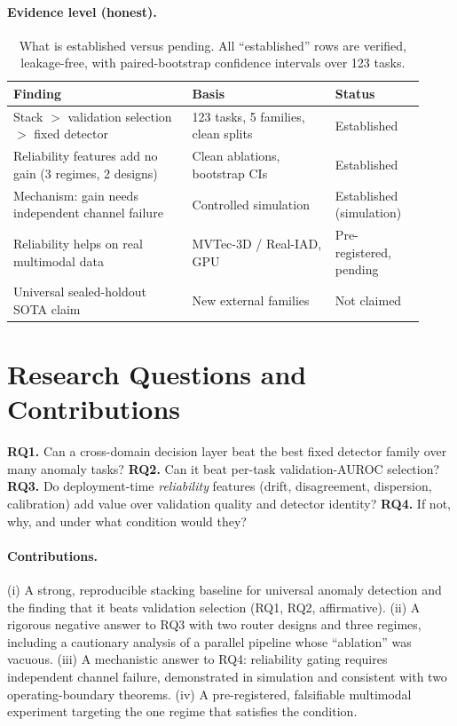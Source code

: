 \documentclass[11pt]{article}
\begin{document}
\paragraph{Evidence level (honest).}
\begin{table}[H]\centering\small
\caption{What is established versus pending. All ``established'' rows are verified,
leakage-free, with paired-bootstrap confidence intervals over 123 tasks.}
\begin{tabular}{L{0.40\linewidth}L{0.32\linewidth}L{0.20\linewidth}}
\toprule
\textbf{Finding} & \textbf{Basis} & \textbf{Status} \\
\midrule
Stack $>$ validation selection $>$ fixed detector & 123 tasks, 5 families, clean splits & Established \\
Reliability features add no gain (3 regimes, 2 designs) & Clean ablations, bootstrap CIs & Established \\
Mechanism: gain needs independent channel failure & Controlled simulation & Established (simulation) \\
Reliability helps on real multimodal data & MVTec-3D / Real-IAD, GPU & Pre-registered, pending \\
Universal sealed-holdout SOTA claim & New external families & Not claimed \\
\bottomrule
\end{tabular}
\end{table}

\section{Research Questions and Contributions}
\textbf{RQ1.} Can a cross-domain decision layer beat the best fixed detector family
over many anomaly tasks? \textbf{RQ2.} Can it beat per-task validation-AUROC
selection? \textbf{RQ3.} Do deployment-time \emph{reliability} features (drift,
disagreement, dispersion, calibration) add value over validation quality and detector
identity? \textbf{RQ4.} If not, why, and under what condition would they?

\paragraph{Contributions.} (i) A strong, reproducible stacking baseline for universal
anomaly detection and the finding that it beats validation selection (RQ1, RQ2,
affirmative). (ii) A rigorous negative answer to RQ3 with two router designs and three
regimes, including a cautionary analysis of a parallel pipeline whose ``ablation''
was vacuous. (iii) A mechanistic answer to RQ4: reliability gating requires
independent channel failure, demonstrated in simulation and consistent with two
operating-boundary theorems. (iv) A pre-registered, falsifiable multimodal experiment
targeting the one regime that satisfies the condition.
\end{document}
